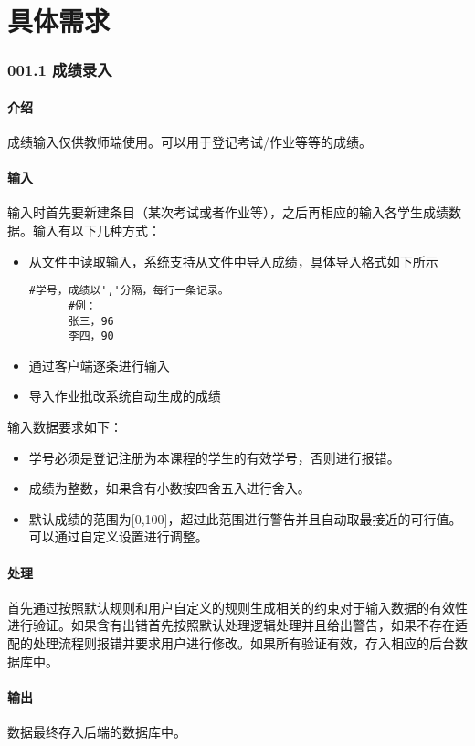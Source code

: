 \chapter{具体需求}
  \subsection{001.1 成绩录入}
    \subsubsection{介绍}
    成绩输入仅供教师端使用。可以用于登记考试/作业等等的成绩。
    \subsubsection{输入}
    输入时首先要新建条目（某次考试或者作业等），之后再相应的输入各学生成绩数据。输入有以下几种方式：
    \begin{itemize}
      \item 从文件中读取输入，系统支持从文件中导入成绩，具体导入格式如下所示
      \begin{lstlisting}[caption=文件导入成绩示例, label={code:import_grade_from_file}]
      #学号，成绩以','分隔，每行一条记录。
      #例：
      张三，96
      李四，90
      \end{lstlisting}
      \item 通过客户端逐条进行输入
      \item 导入作业批改系统自动生成的成绩
    \end{itemize}
    输入数据要求如下：
    \begin{itemize}
      \item 学号必须是登记注册为本课程的学生的有效学号，否则进行报错。
      \item 成绩为整数，如果含有小数按四舍五入进行舍入。
      \item 默认成绩的范围为[0,100]，超过此范围进行警告并且自动取最接近的可行值。可以通过自定义设置进行调整。
    \end{itemize}
    \subsubsection{处理}
    首先通过按照默认规则和用户自定义的规则生成相关的约束对于输入数据的有效性进行验证。如果含有出错首先按照默认处理逻辑处理并且给出警告，如果不存在适配的处理流程则报错并要求用户进行修改。如果所有验证有效，存入相应的后台数据库中。
    \subsubsection{输出}
    数据最终存入后端的数据库中。

